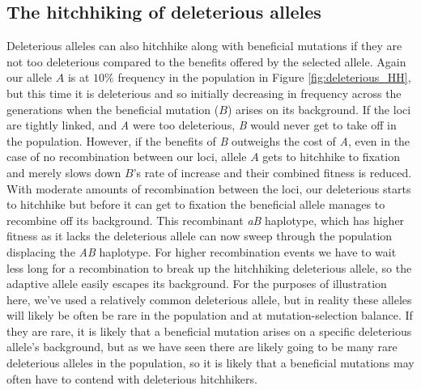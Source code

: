 \subsection{The hitchhiking of deleterious alleles}
Deleterious alleles can also hitchhike along with beneficial mutations if they are not too deleterious compared to the benefits offered by the selected allele. Again our allele $A$ is at $10\%$ frequency in the population in Figure \ref{fig:deleterious_HH}, but this time it is deleterious and so initially decreasing in frequency across the generations when the beneficial mutation ($B$) arises on its background. If the loci are tightly linked, and {\it A} were too deleterious, {\it B} would never get to take off in the population.   However, if the benefits of {\it B} outweighs the cost of {\it A}, even in the case of no recombination between our loci, allele $A$ gets to hitchhike to fixation and merely slows down $B$'s rate of increase and their combined fitness is reduced. With moderate amounts of recombination between the loci, our deleterious starts to hitchhike but before it can get to fixation the beneficial allele manages to recombine off its background. This recombinant {\it aB} haplotype, which has higher fitness as it lacks the deleterious allele can now sweep through the population displacing the {\it AB} haplotype. For higher recombination events we have to wait less long for a recombination to break up the hitchhiking deleterious allele, so the adaptive allele easily escapes its background.
For the purposes of illustration here, we've used a relatively common deleterious allele, but in reality these alleles will likely be often be rare in the population and at mutation-selection balance. If they are rare, it is likely that a beneficial mutation arises on a specific deleterious allele's background, but as we have seen there are likely going to be many rare deleterious alleles in the population, so it is likely that a beneficial mutations may often have to contend with deleterious hitchhikers. 
